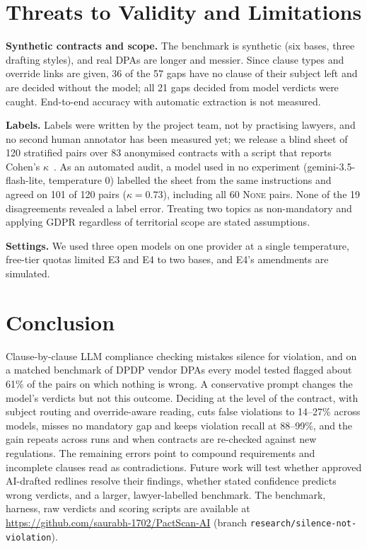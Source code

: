 \documentclass[conference]{IEEEtran}
\begin{document}
\section{Threats to Validity and Limitations}

\textbf{Synthetic contracts and scope.} The benchmark is synthetic (six bases, three drafting styles), and real DPAs are longer and messier. Since clause types and override links are given, 36 of the 57 gaps have no clause of their subject left and are decided without the model; all 21 gaps decided from model verdicts were caught. End-to-end accuracy with automatic extraction is not measured.

\textbf{Labels.} Labels were written by the project team, not by practising lawyers, and no second human annotator has been measured yet; we release a blind sheet of 120 stratified pairs over 83 anonymised contracts with a script that reports Cohen's $\kappa$~\cite{cohen1960kappa}. As an automated audit, a model used in no experiment (gemini-3.5-flash-lite, temperature 0) labelled the sheet from the same instructions and agreed on 101 of 120 pairs ($\kappa=0.73$), including all 60 \textsc{None} pairs. None of the 19 disagreements revealed a label error. Treating two topics as non-mandatory and applying GDPR regardless of territorial scope are stated assumptions.

\textbf{Settings.} We used three open models on one provider at a single temperature, free-tier quotas limited E3 and E4 to two bases, and E4's amendments are simulated.

\section{Conclusion}

Clause-by-clause LLM compliance checking mistakes silence for violation, and on a matched benchmark of DPDP vendor DPAs every model tested flagged about 61\% of the pairs on which nothing is wrong. A conservative prompt changes the model's verdicts but not this outcome. Deciding at the level of the contract, with subject routing and override-aware reading, cuts false violations to 14--27\% across models, misses no mandatory gap and keeps violation recall at 88--99\%, and the gain repeats across runs and when contracts are re-checked against new regulations. The remaining errors point to compound requirements and incomplete clauses read as contradictions. Future work will test whether approved AI-drafted redlines resolve their findings, whether stated confidence predicts wrong verdicts, and a larger, lawyer-labelled benchmark. The benchmark, harness, raw verdicts and scoring scripts are available at \url{https://github.com/saurabh-1702/PactScan-AI} (branch \texttt{research/silence-not-violation}).
\end{document}
